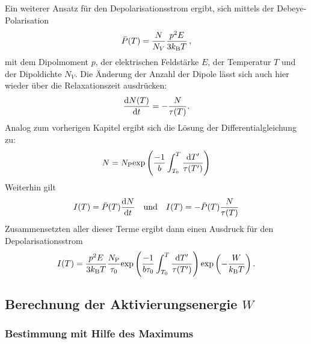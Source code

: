 		Ein weiterer Ansatz für den Depolarisationsstrom ergibt, sich mittels der Debeye-Polarisation
		\begin{equation}
			\bar{P}(T) = \frac{N}{N_V}\frac{p^2E}{3k_{\text{B}}T} \, ,
		\end{equation}	
		mit dem Dipolmoment $p$, der elektrischen Feldstärke $E$, der Temperatur $T$ und der Dipoldichte $N_V$.
		Die Änderung der Anzahl der Dipole lässt sich auch hier wieder über die Relaxationszeit ausdrücken:
		\begin{equation}
			\frac{\text{d} N(T)}{\text{d} t} =- \frac{N}{\tau(T)}.
		\end{equation}
		Analog zum vorherigen Kapitel ergibt sich die Lösung der Differentialgleichung zu:
		\begin{equation}
			N = N_{\text{P}} \text{exp}\left( \frac{-1}{b}\int_{T_0}^T \frac{\text{d}T'}{\tau(T')}\right)
		\end{equation}
		Weiterhin gilt
		\begin{align}
			I(T) = \bar{P}(T)\frac{\text{d} N}{\text{d} t}& &\text{und} & & I(T) = -\bar{P}(T) \frac{N}{\tau(T)}
		\end{align}
		Zusammensetzten aller dieser Terme ergibt dann einen Ausdruck für den Depolarisationsstrom
		\begin{equation}
			I(T) =\frac{p^2E}{3k_{\text{B}}T}\frac{N_{\text{P}}}{\tau_0}\text{exp}\left(\frac{-1}{b\tau_0}\int_{T_0}^T\frac{\text{d}T'}{\tau(T')}\right)\text{exp}\left(-\frac{W}{k_{\text{B}}T}\right).
			\label{eqn:long}
		\end{equation}		

	\subsection{Berechnung der Aktivierungsenergie $W$}
		
		\subsubsection{Bestimmung mit Hilfe des Maximums}

